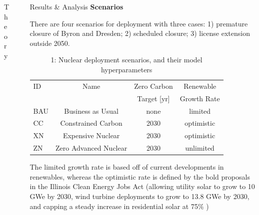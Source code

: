 \documentclass[final]{beamer}
\newlength{\sepwid}
\newlength{\onecolwid}
\newlength{\threecolwid}
\begin{document}
\begin{frame}[t]
\begin{columns}[t,totalwidth=\threecolwid]
\begin{column}{\onecolwid}
\begin{block}{Theory}
\end{block}



\end{column} %

\begin{column}{\sepwid}\end{column} %



\begin{column}{\onecolwid} %

\begin{block}{Results \& Analysis}
\vspace{0.7em}
\textbf{Scenarios}
\vspace{0.7em}

There are four scenarios for deployment with three cases: 1) premature closure of Byron and Dresden; 2) scheduled closure; 3) license extension outside 2050.
\begin{table}[]
	\label{tab:scenarios}
	\caption{1: Nuclear deployment scenarios, and their model hyperparameters \cite{dotson}}
	\begin{tabular}{lccc}
	\hline
	ID  &  Name  &  Zero Carbon  &  Renewable \\
	& & Target [yr] & Growth Rate\\ \hline
	BAU & Business as Usual     & none & limited \\
	CC  & Constrained Carbon    & 2030 & optimistic\\
	XN  & Expensive Nuclear     & 2030 & optimistic \\
	ZN  & Zero Advanced Nuclear & 2030 & unlimited \\ \hline
	\end{tabular}
\end{table}
The limited growth rate is based off of current developments in renewables, whereas the optimistic rate is defined by the bold proposals in the Illinois Clean Energy Jobs Act (allowing utility solar to grow to 10 GWe by 2030, wind turbine deployments to grow to 13.8 GWe by 2030, and capping a steady increase in residential solar at 75\% \cite{gagnon_rooftop_2016})


\end{block}
\end{column}
\end{columns}
\end{frame}
\end{document}
